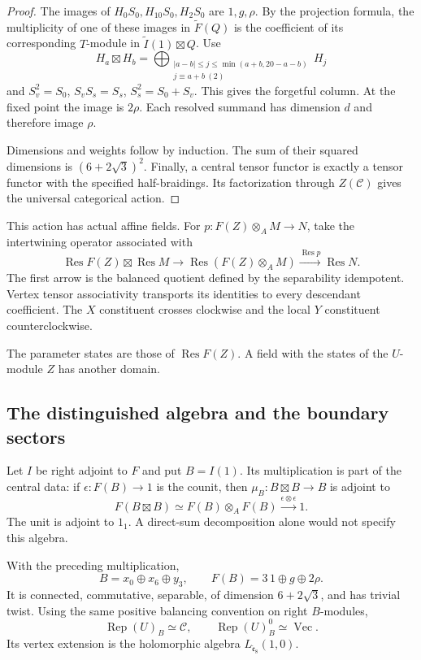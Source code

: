 \begin{proof}
The images of $H_0S_0,H_{10}S_0,H_2S_0$ are $1,g,\rho$.
By the projection formula, the multiplicity of one of these
images in $\widetilde F(Q)$ is the coefficient of its
corresponding $T$-module in $\widetilde I(1)\boxtimes Q$.
Use
\[
 H_a\boxtimes H_b=
 \bigoplus_{\substack{|a-b|\leq j\leq\min(a+b,20-a-b)\\
                      j\equiv a+b\ (2)}}H_j
\]
and $S_v^2=S_0$, $S_vS_s=S_s$, $S_s^2=S_0+S_v$.
This gives the forgetful column. At the fixed point the
image is $2\rho$. Each resolved summand has dimension $d$
and therefore image $\rho$.

Dimensions and weights follow by induction.
The sum of their squared dimensions is
$(6+2\sqrt3)^2$. Finally, a central tensor functor is
exactly a tensor functor with the specified half-braidings.
Its factorization through $Z(\mathcal C)$ gives the
universal categorical action.
\end{proof}

This action has actual affine fields.
For $p:F(Z)\otimes_A M\to N$, take the intertwining operator
associated with
\[
 \operatorname{Res}F(Z)\boxtimes\operatorname{Res}M
 \longrightarrow\operatorname{Res}(F(Z)\otimes_A M)
 \xrightarrow{\operatorname{Res}p}\operatorname{Res}N.
\]
The first arrow is the balanced quotient defined by the
separability idempotent.
Vertex tensor associativity transports its identities
to every descendant coefficient.
The $X$ constituent crosses clockwise and the local $Y$
constituent counterclockwise.

The parameter states are those of $\operatorname{Res}F(Z)$.
A field with the states of the $U$-module $Z$ has another
domain.

\subsection{The distinguished algebra and the boundary sectors}

Let $I$ be right adjoint to $F$ and put $B=I(1)$.
Its multiplication is part of the central data:
if $\epsilon:F(B)\to1$ is the counit, then
$\mu_B:B\boxtimes B\to B$ is adjoint to
\[
 F(B\boxtimes B)\simeq F(B)\otimes_A F(B)
 \xrightarrow{\epsilon\otimes\epsilon}1.
\]
The unit is adjoint to $1_1$. A direct-sum decomposition
alone would not specify this algebra.

\begin{proposition}
\label{v4-arith:centers:prop:e6-marking}
With the preceding multiplication,
\[
 B=x_0\oplus x_6\oplus y_3,\qquad
 F(B)=3\,1\oplus g\oplus2\rho.
\]
It is connected, commutative, separable, of dimension
$6+2\sqrt3$, and has trivial twist.
Using the same positive balancing convention on right
$B$-modules,
\[
 \operatorname{Rep}(U)_B\simeq\mathcal C,\qquad
 \operatorname{Rep}(U)_B^0\simeq\operatorname{Vec}.
\]
Its vertex extension is the holomorphic algebra
$L_{\widehat{\mathfrak e}_8}(1,0)$.
\end{proposition}

